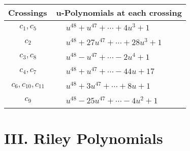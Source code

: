 \documentclass[1p]{elsarticle_modified}
\theoremstyle{definition}
\begin{document}
\begin{tabular}{m{50pt}|m{274pt}}
Crossings & \hspace{64pt}u-Polynomials at each crossing \\
\hline $$\begin{aligned}c_{1},c_{5}\end{aligned}$$&$\begin{aligned}
&u^{48}+u^{47}+\cdots+4 u^3+1
\end{aligned}$\\
\hline $$\begin{aligned}c_{2}\end{aligned}$$&$\begin{aligned}
&u^{48}+27 u^{47}+\cdots+28 u^3+1
\end{aligned}$\\
\hline $$\begin{aligned}c_{3},c_{8}\end{aligned}$$&$\begin{aligned}
&u^{48}- u^{47}+\cdots-2 u^4+1
\end{aligned}$\\
\hline $$\begin{aligned}c_{4},c_{7}\end{aligned}$$&$\begin{aligned}
&u^{48}+u^{47}+\cdots-44 u+17
\end{aligned}$\\
\hline $$\begin{aligned}c_{6},c_{10},c_{11}\end{aligned}$$&$\begin{aligned}
&u^{48}+3 u^{47}+\cdots+8 u+1
\end{aligned}$\\
\hline $$\begin{aligned}c_{9}\end{aligned}$$&$\begin{aligned}
&u^{48}-25 u^{47}+\cdots-4 u^2+1
\end{aligned}$\\
\hline
\end{tabular}\newpage\renewcommand{\arraystretch}{1}
\centering \section*{ III. Riley Polynomials}
\end{document}
